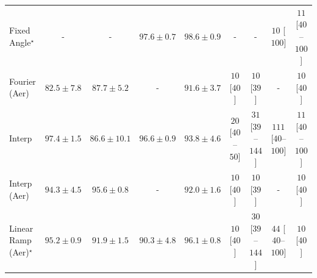 \begin{tabular}{l|cccc|cccc|}
Fixed Angle$^\star$ & {\cellcolor[HTML]{000000}} \color[HTML]{F1F1F1} {\cellcolor{white}} \color{black} - & {\cellcolor[HTML]{000000}} \color[HTML]{F1F1F1} {\cellcolor{white}} \color{black} - & {\cellcolor[HTML]{802D05}} \color[HTML]{F1F1F1} $97.6\pm 0.7$ & {\cellcolor[HTML]{6C2706}} \color[HTML]{F1F1F1} $98.6\pm 0.9$ & {\cellcolor[HTML]{000000}} \color[HTML]{F1F1F1} {\cellcolor{white}} \color{black} - & {\cellcolor[HTML]{000000}} \color[HTML]{F1F1F1} {\cellcolor{white}} \color{black} - & {\cellcolor[HTML]{FFF7F3}} \color[HTML]{000000} $10$ [$100$] & {\cellcolor[HTML]{FFF7F3}} \color[HTML]{000000} $11$ [$40$--$100$] \\
Fourier (Aer) & {\cellcolor[HTML]{FEE596}} \color[HTML]{000000} $82.5\pm 7.8$ & {\cellcolor[HTML]{FEA030}} \color[HTML]{000000} $87.7\pm 5.2$ & {\cellcolor[HTML]{000000}} \color[HTML]{F1F1F1} {\cellcolor{white}} \color{black} - & {\cellcolor[HTML]{E3660F}} \color[HTML]{F1F1F1} $91.6\pm 3.7$ & {\cellcolor[HTML]{FFF7F3}} \color[HTML]{000000} $10$ [$40$] & {\cellcolor[HTML]{FFF7F3}} \color[HTML]{000000} $10$ [$39$] & {\cellcolor[HTML]{000000}} \color[HTML]{F1F1F1} {\cellcolor{white}} \color{black} - & {\cellcolor[HTML]{FFF7F3}} \color[HTML]{000000} $10$ [$40$] \\
Interp & {\cellcolor[HTML]{832D05}} \color[HTML]{F1F1F1} $97.4\pm 1.5$ & {\cellcolor[HTML]{FEB23F}} \color[HTML]{000000} $86.6\pm 10.1$ & {\cellcolor[HTML]{933204}} \color[HTML]{F1F1F1} $96.6\pm 0.9$ & {\cellcolor[HTML]{C84A02}} \color[HTML]{F1F1F1} $93.8\pm 4.6$ & {\cellcolor[HTML]{FFF4F0}} \color[HTML]{000000} $20$ [$40$--$50$] & {\cellcolor[HTML]{FEF1ED}} \color[HTML]{000000} $31$ [$39$--$144$] & {\cellcolor[HTML]{FDDAD7}} \color[HTML]{000000} $111$ [$40$--$100$] & {\cellcolor[HTML]{FFF7F3}} \color[HTML]{000000} $11$ [$40$--$100$] \\
Interp (Aer) & {\cellcolor[HTML]{BE4503}} \color[HTML]{F1F1F1} $94.3\pm 4.5$ & {\cellcolor[HTML]{A63A03}} \color[HTML]{F1F1F1} $95.6\pm 0.8$ & {\cellcolor[HTML]{000000}} \color[HTML]{F1F1F1} {\cellcolor{white}} \color{black} - & {\cellcolor[HTML]{DE610C}} \color[HTML]{F1F1F1} $92.0\pm 1.6$ & {\cellcolor[HTML]{FFF7F3}} \color[HTML]{000000} $10$ [$40$] & {\cellcolor[HTML]{FFF7F3}} \color[HTML]{000000} $10$ [$39$] & {\cellcolor[HTML]{000000}} \color[HTML]{F1F1F1} {\cellcolor{white}} \color{black} - & {\cellcolor[HTML]{FFF7F3}} \color[HTML]{000000} $10$ [$40$] \\
Linear Ramp (Aer)$^\star$ & {\cellcolor[HTML]{AE3E03}} \color[HTML]{F1F1F1} $95.2\pm 0.9$ & {\cellcolor[HTML]{E0630D}} \color[HTML]{F1F1F1} $91.9\pm 1.5$ & {\cellcolor[HTML]{F07919}} \color[HTML]{F1F1F1} $90.3\pm 4.8$ & {\cellcolor[HTML]{9C3604}} \color[HTML]{F1F1F1} $96.1\pm 0.8$ & {\cellcolor[HTML]{FFF7F3}} \color[HTML]{000000} $10$ [$40$] & {\cellcolor[HTML]{FEF1ED}} \color[HTML]{000000} $30$ [$39$--$144$] & {\cellcolor[HTML]{FEEEEA}} \color[HTML]{000000} $44$ [$40$--$100$] & {\cellcolor[HTML]{FFF7F3}} \color[HTML]{000000} $10$ [$40$] \\

\end{tabular}
